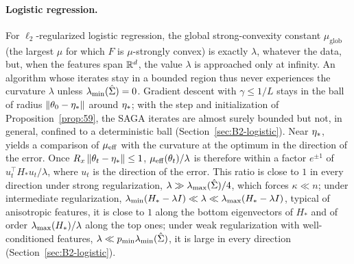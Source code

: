 \paragraph{Logistic regression.}
For $\ell_2$-regularized logistic regression, the global strong-convexity constant $\mu_{\mathrm{glob}}$ (the largest $\mu$
for which $F$ is $\mu$-strongly convex) is exactly $\lambda$, whatever the data, but, when the features span $\mathbb{R}^d$, the
value $\lambda$ is approached only at infinity.
An algorithm whose iterates stay in a bounded region thus never experiences the curvature $\lambda$ unless
$\lambda_{\min}(\hat\Sigma)=0$. Gradient descent with $\gamma\le1/L$ stays in the ball of radius $\left\|\theta_0-\eta_\ast\right\|$ around
$\eta_\ast$; with the step and initialization of Proposition~\ref{prop:59}, the SAGA iterates are almost surely bounded
but not, in general, confined to a deterministic ball (Section~\ref{sec:B2-logistic}). Near $\eta_\ast$,
 yields a comparison of $\mu_{\mathrm{eff}}$ with the curvature at the optimum in the direction of the error.
Once $R_x\left\|\theta_t-\eta_\ast\right\|\le1$, $\mu_{\mathrm{eff}}(\theta_t)/\lambda$ is therefore within a factor $e^{\pm1}$ of
$u_t^\top H_\ast u_t/\lambda$, where $u_t$ is the direction of the error. This ratio is close to $1$ in every direction
under strong regularization, $\lambda\gg\lambda_{\max}(\hat\Sigma)/4$, which forces $\kappa\ll n$; under intermediate
regularization, $\lambda_{\min}(H_\ast-\lambda I)\ll\lambda\ll\lambda_{\max}(H_\ast-\lambda I)$, typical of anisotropic features, it is
close to $1$ along the bottom eigenvectors of $H_\ast$ and of order $\lambda_{\max}(H_\ast)/\lambda$ along the top ones; under weak
regularization with well-conditioned features, $\lambda\ll p_{\min}\lambda_{\min}(\hat\Sigma)$, it is large in every direction
(Section~\ref{sec:B2-logistic}).


